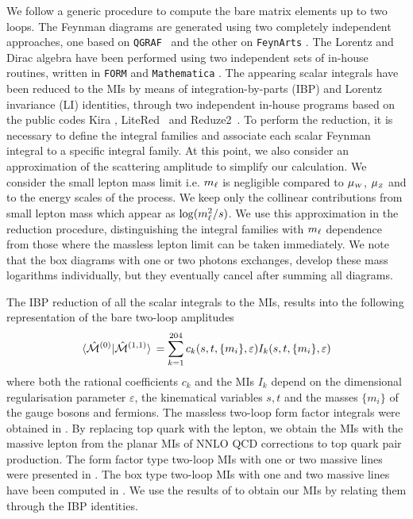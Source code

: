 \documentclass[a4paper]{jpconf}
\begin{document}
We follow a generic procedure to compute the bare matrix elements up to two loops.
% 
The Feynman diagrams are generated using two completely independent approaches,
one based on {\tt QGRAF}~\cite{Nogueira:1991ex} and the other on {\tt FeynArts} \cite{Hahn:2000kx}.
% 
The Lorentz and Dirac algebra have been performed using 
two independent sets of in-house routines,
written in {\tt FORM} \cite{Vermaseren:2000nd} and {\tt Mathematica} \cite{Mathematica}.
The appearing scalar integrals have been reduced to the MIs by means of 
integration-by-parts (IBP) \cite{Tkachov:1981wb,Chetyrkin:1981qh} and
Lorentz invariance (LI) \cite{Gehrmann:1999as} identities,
through two independent in-house programs based on the public codes
{\sc Kira} \cite{Maierhofer:2017gsa}, {\sc LiteRed}~\cite{Lee:2013mka, Lee:2012cn} and
{\sc Reduze}2~\cite{vonManteuffel:2012np, Studerus:2009ye}.
% 
% 
To perform the reduction, it is necessary to define the integral families 
and associate each scalar Feynman integral to a specific integral family.
% 
At this point, we also consider an approximation of the scattering amplitude
to simplify our calculation.
We consider the small lepton mass limit 
i.e. $m_\ell$ is negligible compared
to $\mu_{\scriptscriptstyle W}$, $\mu_{\scriptscriptstyle Z}$ and to the energy scales of the process.
% 
We keep only the collinear contributions from small lepton mass
which appear as $\log(m_\ell^2/s)$.
% 
We use this approximation in the reduction procedure,
distinguishing the integral families with $m_\ell$ dependence
from those where the massless lepton limit can be taken immediately.
% 
We note that the box diagrams with one or two photons exchanges,
develop these mass logarithms individually,
but they eventually cancel \cite{Frenkel:1976bj} after summing all diagrams.



The IBP reduction of all the scalar integrals to the MIs, results into the following
representation of the bare two-loop amplitudes
\begin{equation}
\langle \unM^{(0)} | \unM^{(1,1)} \rangle \, = \sum_{k=1}^{204} c_k(s,t,\{m_i\},\varepsilon) I_k(s,t,\{m_i\},\varepsilon)
\label{eq:sumint}
\end{equation}
where both the rational coefficients $c_k$ and the MIs $I_k$ depend on the dimensional regularisation parameter $\varepsilon$,
the kinematical variables $s,t$ and the masses $\{m_i\}$ of the gauge bosons and fermions.
% 
The massless two-loop form factor integrals were obtained in \cite{Gehrmann:2005pd}.
% 
By replacing top quark with the lepton, we obtain the MIs with the massive lepton 
from the planar MIs \cite{Bonciani:2008az, Bonciani:2009nb} of NNLO QCD corrections to top quark pair production.
% 
The form factor type two-loop MIs with one or two massive lines were presented in \cite{Aglietti:2003yc,Aglietti:2004tq}.
% 
The box type two-loop MIs with one and two massive lines have been computed in \cite{Bonciani:2016ypc,Heller:2019gkq,Hasan:2020vwn}.
We use the results of \cite{Bonciani:2016ypc} to obtain our MIs by relating them through the IBP identities.
\end{document}
